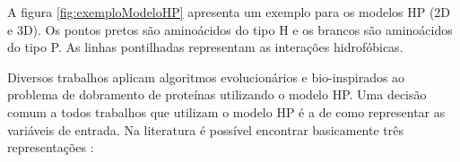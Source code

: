 A figura \ref{fig:exemploModeloHP} apresenta um exemplo para os modelos HP (2D e 3D). Os pontos pretos são aminoácidos do tipo H e os brancos são aminoácidos do tipo P. As linhas pontilhadas representam as interações hidrofóbicas.



Diversos trabalhos aplicam algoritmos evolucionários e bio-inspirados ao problema de dobramento de proteínas utilizando o modelo HP. Uma decisão comum a todos trabalhos que utilizam o modelo HP é a de como representar as variáveis de entrada. Na literatura é possível encontrar basicamente três representações \cite{krasnogor1999protein, lopes2008evolutionary}: 

